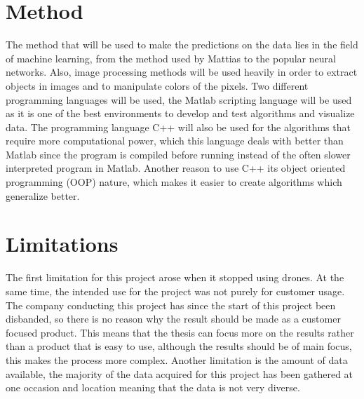 \section{Method}

The method that will be used to make the predictions on the data lies in the field of machine learning, from the method used by Mattias to the popular neural networks. Also, image processing methods will be used heavily in order to extract objects in images and to manipulate colors of the pixels. Two different programming languages will be used, the Matlab scripting language will be used as it is one of the best environments to develop and test algorithms and visualize data. The programming language C++ will also be used for the algorithms that require more computational power, which this language deals with better than Matlab since the program is compiled before running instead of the often slower interpreted program in Matlab. Another reason to use C++ its object oriented programming (OOP) nature, which makes it easier to create algorithms which generalize better.

\section{Limitations}

The first limitation for this project arose when it stopped using drones. At the same time, the intended use for the project was not purely for customer usage. The company conducting this project has since the start of this project been disbanded, so there is no reason why the result should be made as a customer focused product. This means that the thesis can focus more on the results rather than a product that is easy to use, although the results should be of main focus, this makes the process more complex. Another limitation is the amount of data available, the majority of the data acquired for this project has been gathered at one occasion and location meaning that the data is not very diverse.
